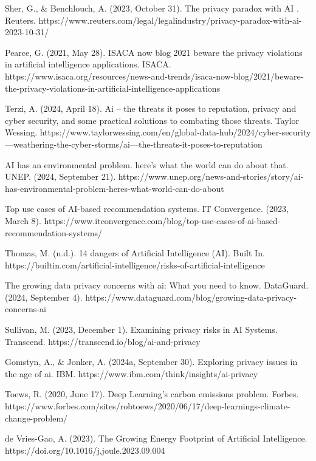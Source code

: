 \documentclass[licencjacka,en]{pracamgr}
\begin{document}
\begin{thebibliography}{99}
Sher, G., \& Benchlouch, A. (2023, October 31). The privacy paradox with AI . Reuters. https://www.reuters.com/legal/legalindustry/privacy-paradox-with-ai-2023-10-31/ 

Pearce, G. (2021, May 28). ISACA now blog 2021 beware the privacy violations in artificial intelligence applications. ISACA. https://www.isaca.org/resources/news-and-trends/isaca-now-blog/2021/beware-the-privacy-violations-in-artificial-intelligence-applications 

Terzi, A. (2024, April 18). Ai – the threats it poses to reputation, privacy and cyber security, and some practical solutions to combating those threats. Taylor Wessing. https://www.taylorwessing.com/en/global-data-hub/2024/cyber-security---weathering-the-cyber-storms/ai---the-threats-it-poses-to-reputation 

AI has an environmental problem. here’s what the world can do about that. UNEP. (2024, September 21). https://www.unep.org/news-and-stories/story/ai-has-environmental-problem-heres-what-world-can-do-about 

Top use cases of AI-based recommendation systems. IT Convergence. (2023, March 8). https://www.itconvergence.com/blog/top-use-cases-of-ai-based-recommendation-systems/ 

Thomas, M. (n.d.). 14 dangers of Artificial Intelligence (AI). Built In. https://builtin.com/artificial-intelligence/risks-of-artificial-intelligence 

The growing data privacy concerns with ai: What you need to know. DataGuard. (2024, September 4). https://www.dataguard.com/blog/growing-data-privacy-concerns-ai 

Sullivan, M. (2023, December 1). Examining privacy risks in AI Systems. Transcend. https://transcend.io/blog/ai-and-privacy 

Gomstyn, A., \& Jonker, A. (2024a, September 30). Exploring privacy issues in the age of ai. IBM. https://www.ibm.com/think/insights/ai-privacy 

Toews, R. (2020, June 17). Deep Learning’s carbon emissions problem. Forbes. https://www.forbes.com/sites/robtoews/2020/06/17/deep-learnings-climate-change-problem/ 

de Vries-Gao, A. (2023). The Growing Energy Footprint of Artificial Intelligence. https://doi.org/10.1016/j.joule.2023.09.004 


\end{thebibliography}
\end{document}
